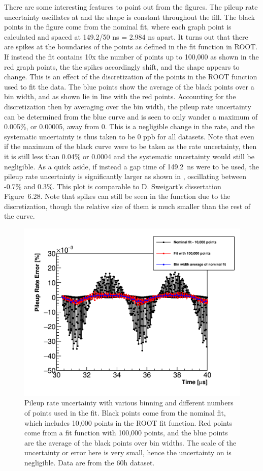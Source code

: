 There are some interesting features to point out from the figures. The pileup rate uncertainty oscillates at \wa and the shape is constant throughout the fill. The black points in the figure come from the nominal fit, where each graph point is calculated and spaced at 149.2/50 ns = 2.984 ns apart. It turns out that there are spikes at the boundaries of the points as defined in the fit function in ROOT. If instead the fit contains 10x the number of points up to 100,000 as shown in the red graph points, the the spikes accordingly shift, and the shape appears to change. This is an effect of the discretization of the points in the ROOT function used to fit the data. The blue points show the average of the black points over a bin width, and as shown lie in line with the red points. Accounting for the discretization then by averaging over the bin width, the pileup rate uncertainty can be determined from the blue curve and is seen to only wander a maximum of 0.005\%, or 0.00005, away from 0. This is a negligible change in the rate, and the systematic uncertainty is thus taken to be 0 ppb for all datasets. Note that even if the maximum of the black curve were to be taken as the rate uncertainty, then it is still less than 0.04\% or 0.0004 and the systematic uncertainty would still be negligible. As a quick aside, if instead a gap time of \SI{149.2}{\ns} were to be used, the pileup rate uncertainty is significantly larger as shown in , oscillating between -0.7\% and 0.3\%. This plot is comparable to D. Sweigart's dissertation Figure~6.28. Note that spikes can still be seen in the function due to the discretization, though the relative size of them is much smaller than the rest of the curve.




\begin{figure}
    \centering
    \includegraphics[width=.6\textwidth]{PileupRateError}
    \caption[]{Pileup rate uncertainty with various binning and different numbers of points used in the fit. Black points come from the nominal fit, which includes 10,000 points in the ROOT fit function. Red points come from a fit function with 100,000 points, and the blue points are the average of the black points over bin widths. The scale of the uncertainty or error here is very small, hence the uncertainty on \R is negligible. Data are from the 60h dataset.}
    \label{fig:pileupRateError}
\end{figure}

